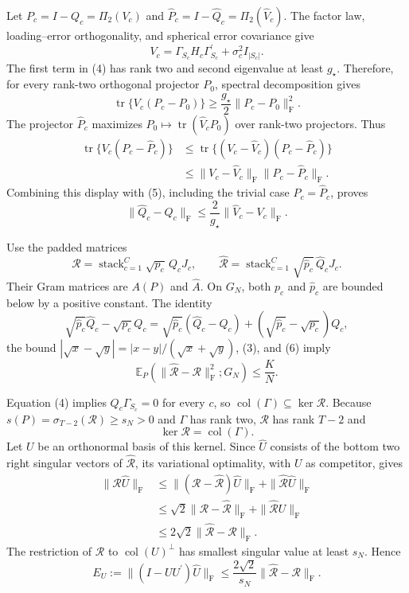 Let \(P_c=I-Q_c=\Pi_2(V_c)\) and \(\widehat P_c=I-\widehat Q_c=\Pi_2(\widehat V_c)\).  The factor law, loading--error orthogonality, and spherical error covariance give
\[
V_c=\Gamma_{S_c}H_c\Gamma_{S_c}^{\prime}+\sigma_c^2I_{|S_c|}.
\tag{4}
\]
The first term in (4) has rank two and second eigenvalue at least \(g_\star\).  Therefore, for every rank-two orthogonal projector \(P_0\), spectral decomposition gives
\[
\operatorname{tr}\{V_c(P_c-P_0)\}
\ge\frac{g_\star}{2}\|P_c-P_0\|_{\mathrm F}^2.
\tag{5}
\]
The projector \(\widehat P_c\) maximizes \(P_0\mapsto\operatorname{tr}(\widehat V_cP_0)\) over rank-two projectors. Thus
\[
\begin{aligned}
\operatorname{tr}\{V_c(P_c-\widehat P_c)\}
&\le \operatorname{tr}\{(V_c-\widehat V_c)(P_c-\widehat P_c)\}\\
&\le \|V_c-\widehat V_c\|_{\mathrm F}
       \|P_c-\widehat P_c\|_{\mathrm F}.
\end{aligned}
\]
Combining this display with (5), including the trivial case \(P_c=\widehat P_c\), proves
\[
\|\widehat Q_c-Q_c\|_{\mathrm F}
\le \frac{2}{g_\star}\|\widehat V_c-V_c\|_{\mathrm F}.
\tag{6}
\]

Use the padded matrices
\[
\mathcal R=\operatorname{stack}_{c=1}^C\sqrt{p_c}\,Q_cJ_c,
\qquad
\widehat{\mathcal R}
=\operatorname{stack}_{c=1}^C\sqrt{\widehat p_c}\,\widehat Q_cJ_c.
\]
Their Gram matrices are \(A(P)\) and \(\widehat A\).  On \(G_N\), both \(p_c\) and \(\widehat p_c\) are bounded below by a positive constant.  The identity
\[
\sqrt{\widehat p_c}\widehat Q_c-\sqrt{p_c}Q_c
=\sqrt{\widehat p_c}(\widehat Q_c-Q_c)
+(\sqrt{\widehat p_c}-\sqrt{p_c})Q_c,
\]
the bound
\(|\sqrt x-\sqrt y|=|x-y|/(\sqrt x+\sqrt y)\), (3), and (6) imply
\[
\mathbb E_P\!\left(
\|\widehat{\mathcal R}-\mathcal R\|_{\mathrm F}^2;G_N
\right)\le\frac K N.
\tag{7}
\]

Equation (4) implies \(Q_c\Gamma_{S_c}=0\) for every \(c\), so
\(\operatorname{col}(\Gamma)\subseteq\ker\mathcal R\).  Because
\(s(P)=\sigma_{T-2}(\mathcal R)\ge s_N>0\) and \(\Gamma\) has rank two, \(\mathcal R\) has rank \(T-2\) and
\[
\ker\mathcal R=\operatorname{col}(\Gamma).
\tag{8}
\]
Let \(U\) be an orthonormal basis of this kernel.  Since \(\widehat U\) consists of the bottom two right singular vectors of \(\widehat{\mathcal R}\), its variational optimality, with \(U\) as competitor, gives
\[
\begin{aligned}
\|\mathcal R\widehat U\|_{\mathrm F}
&\le \|(\mathcal R-\widehat{\mathcal R})\widehat U\|_{\mathrm F}
     +\|\widehat{\mathcal R}\widehat U\|_{\mathrm F}\\
&\le \sqrt2\|\mathcal R-\widehat{\mathcal R}\|_{\mathrm F}
     +\|\widehat{\mathcal R}U\|_{\mathrm F}\\
&\le2\sqrt2\|\widehat{\mathcal R}-\mathcal R\|_{\mathrm F}.
\end{aligned}
\]
The restriction of \(\mathcal R\) to \(\operatorname{col}(U)^\perp\) has smallest singular value at least \(s_N\). Hence
\[
E_U:=\|(I-UU^{\prime})\widehat U\|_{\mathrm F}
\le\frac{2\sqrt2}{s_N}
\|\widehat{\mathcal R}-\mathcal R\|_{\mathrm F}.
\tag{9}
\]

